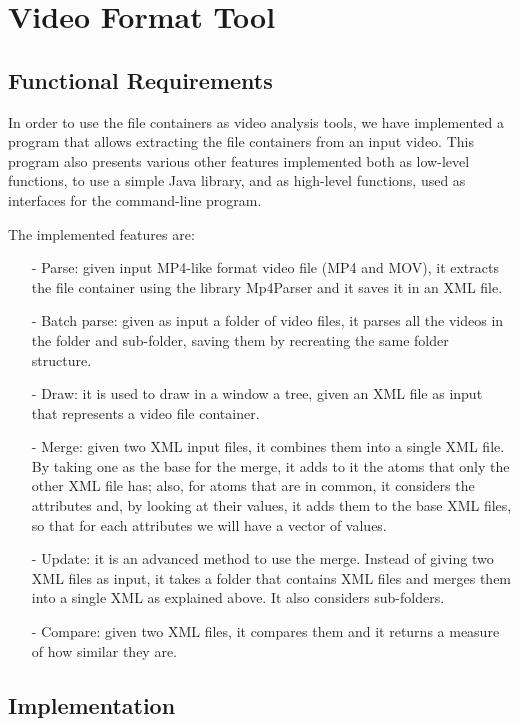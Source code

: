 \section{Video Format Tool}

\subsection{Functional Requirements}

In order to use the file containers as video analysis tools, we have implemented a program that allows extracting the file containers from an input video.
This program also presents various other features implemented both as low-level functions, to use a simple Java library, and as high-level functions, used as interfaces for the command-line program.

The implemented features are:
\begin{itemize}
\item[-] Parse: given input MP4-like format video file (MP4 and MOV), it extracts the file container using the library Mp4Parser and it saves it in an XML file.
\item[-] Batch parse: given as input a folder of video files, it parses all the videos in the folder and sub-folder, saving them by recreating the same folder structure.
\item[-] Draw: it is used to draw in a window a tree, given an XML file as input that represents a video file container.
\item[-] Merge: given two XML input files, it combines them into a single XML file. By taking one as the base for the merge, it adds to it the atoms that only the other XML file has; also, for atoms that are in common, it considers the attributes and, by looking at their values, it adds them to the base XML files, so that for each attributes we will have a vector of values.
\item[-] Update: it is an advanced method to use the merge. Instead of giving two XML files as input, it takes a folder that contains XML files and merges them into a single XML as explained above. It also considers sub-folders.
\item[-] Compare: given two XML files, it compares them and it returns a measure of how similar they are.
\end{itemize}

\subsection{Implementation} 
 

